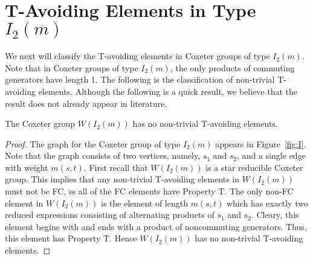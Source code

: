 
\section{T-Avoiding Elements in Type $I_2(m)$}

We next will classify the T-avoiding elements in Coxeter groups of type $I_2(m)$. Note that in Coxeter groups of type $I_2(m)$, the only products of commuting generators have length 1. The following is the classification of non-trivial T-avoiding elements. Although the following is a quick result, we believe that the result does not already appear in literature.
\begin{theorem}
The Coxeter group $W(I_2(m))$ has no non-trivial T-avoiding elements.
\begin{proof}
	The graph for the Coxeter group of type $I_2(m)$ appears in Figure~\ref{fig:I}. Note that the graph consists of two vertices, namely, $s_1$ and $s_2$, and a single edge with weight $m(s,t)$. First recall that $W(I_2(m))$ is a star reducible Coxeter group. This implies that any non-trivial T-avoiding elements in $W(I_2(m))$ must not be FC, ss all of the FC elements have Property T. The only non-FC element in $W(I_2(m))$ is the element of length $m(s,t)$ which has exactly two reduced expressions consisting of alternating products of $s_1$ and $s_2$. Cleary, this element begins with and ends with a product of noncommuting generators. Thus, this element has Property T. Hence $W(I_2(m))$ has no non-trivial T-avoiding elements. 
\end{proof}	
\end{theorem}
 



